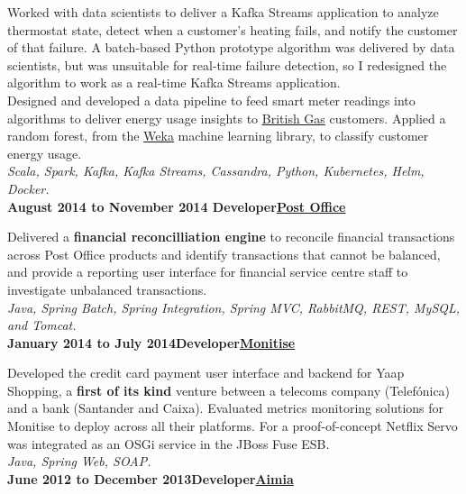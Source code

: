 \documentclass[a4paper,12pt]{article}
\newcommand{\clientwork}[3]{\textbf{#1\hfill#3\hfill#2}\nopagebreak}
\newcommand{\renewals}[1]{}
\newcommand{\techstack}[1]{\textit{#1}}
\begin{document}
Worked with data scientists to deliver a Kafka Streams application to analyze thermostat state, detect when a customer's heating fails, and notify the customer of that failure. A batch-based Python prototype algorithm was delivered by data scientists, but was unsuitable for real-time failure detection, so I redesigned the algorithm to work as a real-time Kafka Streams application.\\

Designed and developed a data pipeline to feed smart meter readings into algorithms to deliver energy usage insights to \href{https://www.britishgas.co.uk}{British Gas} customers. Applied a random forest, from the \href{https://www.cs.waikato.ac.nz/ml/weka/}{Weka} machine learning library, to classify customer energy usage. \\

\techstack{Scala, Spark, Kafka, Kafka Streams, Cassandra, Python, Kubernetes, Helm, Docker.}\\

\clientwork{August 2014 to November 2014 }{\href{http://www.postoffice.co.uk/}{Post Office}}{Developer}

Delivered a \textbf{financial reconcilliation engine} to reconcile financial transactions across Post Office products and identify transactions that cannot be balanced, and provide a reporting user interface for financial service centre staff to investigate unbalanced transactions.\\

\techstack{Java, Spring Batch, Spring Integration, Spring MVC, RabbitMQ, REST, MySQL, and Tomcat.}\\

\clientwork{January 2014 to July 2014}{\href{http://www.monitise.com/}{Monitise}}{Developer}

Developed the credit card payment user interface and backend for Yaap Shopping, a \textbf{first of its kind} venture between a telecoms company (Telef\'onica) and a bank (Santander and Caixa).  Evaluated metrics monitoring solutions for Monitise to deploy across all their platforms. For a proof-of-concept Netflix Servo was integrated as an OSGi service in the JBoss Fuse ESB.\\

\techstack{Java, Spring Web, SOAP.}\\

\clientwork{June 2012 to December 2013}{\href{http://www.aimia.com/}{Aimia}}{Developer}

\renewals{2}
\end{document}
